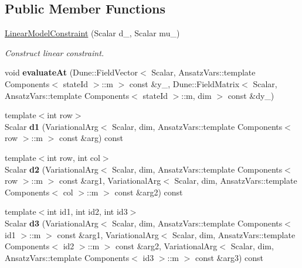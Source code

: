 \subsection*{Public Member Functions}
\begin{DoxyCompactItemize}
\item 
\hyperlink{classKaskade_1_1LinearModelConstraint_a381b39bdcc9a6efd7a8566b36e6ae5bd}{Linear\-Model\-Constraint} (Scalar d\-\_\-, Scalar mu\-\_\-)
\begin{DoxyCompactList}\small\item\em Construct linear constraint. \end{DoxyCompactList}\item 
\hypertarget{classKaskade_1_1LinearModelConstraint_a9107a6c060676057ee27075d6c28ed5f}{void {\bfseries evaluate\-At} (Dune\-::\-Field\-Vector$<$ Scalar, Ansatz\-Vars\-::template Components$<$ state\-Id $>$\-::m $>$ const \&y\-\_\-, Dune\-::\-Field\-Matrix$<$ Scalar, Ansatz\-Vars\-::template Components$<$ state\-Id $>$\-::m, dim $>$ const \&dy\-\_\-)}\label{classKaskade_1_1LinearModelConstraint_a9107a6c060676057ee27075d6c28ed5f}

\item 
\hypertarget{classKaskade_1_1LinearModelConstraint_afc8dd6477c2f6353664d27606e158a3a}{{\footnotesize template$<$int row$>$ }\\Scalar {\bfseries d1} (Variational\-Arg$<$ Scalar, dim, Ansatz\-Vars\-::template Components$<$ row $>$\-::m $>$ const \&arg) const }\label{classKaskade_1_1LinearModelConstraint_afc8dd6477c2f6353664d27606e158a3a}

\item 
\hypertarget{classKaskade_1_1LinearModelConstraint_aaa6b39b59deeb6fe8e1e24ccc1510a28}{{\footnotesize template$<$int row, int col$>$ }\\Scalar {\bfseries d2} (Variational\-Arg$<$ Scalar, dim, Ansatz\-Vars\-::template Components$<$ row $>$\-::m $>$ const \&arg1, Variational\-Arg$<$ Scalar, dim, Ansatz\-Vars\-::template Components$<$ col $>$\-::m $>$ const \&arg2) const }\label{classKaskade_1_1LinearModelConstraint_aaa6b39b59deeb6fe8e1e24ccc1510a28}

\item 
\hypertarget{classKaskade_1_1LinearModelConstraint_a49c21e1ab328285958cc8c9a9ac907dd}{{\footnotesize template$<$int id1, int id2, int id3$>$ }\\Scalar {\bfseries d3} (Variational\-Arg$<$ Scalar, dim, Ansatz\-Vars\-::template Components$<$ id1 $>$\-::m $>$ const \&arg1, Variational\-Arg$<$ Scalar, dim, Ansatz\-Vars\-::template Components$<$ id2 $>$\-::m $>$ const \&arg2, Variational\-Arg$<$ Scalar, dim, Ansatz\-Vars\-::template Components$<$ id3 $>$\-::m $>$ const \&arg3) const }\label{classKaskade_1_1LinearModelConstraint_a49c21e1ab328285958cc8c9a9ac907dd}

\end{DoxyCompactItemize}
